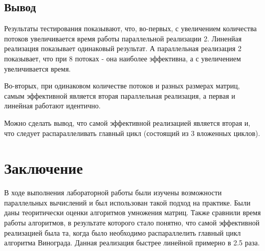 \documentclass[14pt, a4paper]{extarticle}
\begin{document}
\subsection{Вывод}
Результаты тестирования показывают, что, во-первых, с увеличением количества потоков увеличивается время работы параллельной реализации 2. Линенйая реализация показывает одинаковый результат. А параллельная реализация 2 показывает, что при 8 потоках - она наиболее эффективна, а с увеличением увеличивается время.\par
Во-вторых, при одинаковом количестве потоков и разных размерах матриц, самым эффективной является вторая параллельная реализация, а первая и линейная работают идентично.\par
Можно сделать вывод, что самой эффективной реализацией является вторая и, что следует распараллеливать главный цикл (состоящий из 3 вложенных циклов).

\clearpage
\section{Заключение}
В ходе выполнения лабораторной работы были изучены возможности параллельных вычислений и был использован такой подход на практике. Были даны теоритически оценки алгоритмов умножения матриц. Также сравнили время работы алгоритмов, в результате которого стало понятно, что самой эффективной реализацией была та, когда было необходимо распараллелить главный цикл алгоритма Винограда. Данная реализация быстрее линейной примерно в 2.5 раза.


\clearpage
\end{document}
